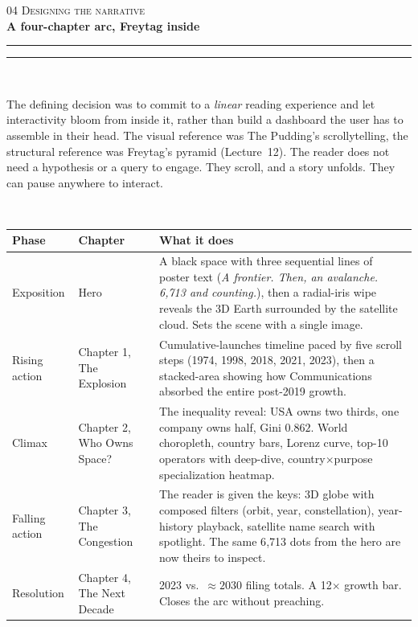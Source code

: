 \documentclass[9pt,a4paper]{article}
\newcommand{\eyebrow}[1]{{\footnotesize\textcolor{accentBlue}{\textsc{#1}}}}
\newcommand{\pageheader}[3]{%
  {\eyebrow{#1 \quad\textbullet\quad #2}}\\[3pt]%
  {\Large\bfseries #3}\\[3pt]%
  {\color{accentBlue}\rule{4em}{1.5pt}}\hspace{1pt}%
  {\color{accentBlue!28}\rule{\dimexpr\linewidth-4em-1pt\relax}{0.5pt}}\\[4pt]%
}
\newcommand{\subhead}[1]{%
  \vspace{4pt}%
  \noindent\tcbox[
    on line,
    colback=accentBlue!10!white, colframe=accentBlue,
    boxrule=0.3pt, arc=2.5pt,
    left=7pt, right=7pt, top=0.5pt, bottom=0.5pt,
  ]{\small\bfseries\color{accentBlue!85!black}#1}\\[2pt]%
}
\begin{document}
\pageheader{04}{Designing the narrative}{A four-chapter arc, Freytag inside}

\vspace{2pt}

The defining decision was to commit to a \textit{linear} reading experience and let interactivity bloom from inside it, rather than build a dashboard the user has to assemble in their head. The visual reference was The Pudding's scrollytelling, the structural reference was Freytag's pyramid (Lecture~12). The reader does not need a hypothesis or a query to engage. They scroll, and a story unfolds. They can pause anywhere to interact.

\vspace{2pt}

\subhead{Freytag's pyramid mapped to chapters}

\begin{tabularx}{\textwidth}{@{} l l X @{}}
\toprule
\textbf{Phase} & \textbf{Chapter} & \textbf{What it does}\\
\midrule
Exposition       & Hero                    & A black space with three sequential lines of poster text (\textit{A frontier. Then, an avalanche. 6{,}713 and counting.}), then a radial-iris wipe reveals the 3D Earth surrounded by the satellite cloud. Sets the scene with a single image.\\
Rising action    & Chapter 1, The Explosion & Cumulative-launches timeline paced by five scroll steps (1974, 1998, 2018, 2021, 2023), then a stacked-area showing how Communications absorbed the entire post-2019 growth.\\
Climax           & Chapter 2, Who Owns Space? & The inequality reveal: USA owns two thirds, one company owns half, Gini $0.862$. World choropleth, country bars, Lorenz curve, top-10 operators with deep-dive, country$\times$purpose specialization heatmap.\\
Falling action   & Chapter 3, The Congestion & The reader is given the keys: 3D globe with composed filters (orbit, year, constellation), year-history playback, satellite name search with spotlight. The same 6{,}713 dots from the hero are now theirs to inspect.\\
Resolution       & Chapter 4, The Next Decade & 2023 vs.\ $\approx 2030$ filing totals. A 12$\times$ growth bar. Closes the arc without preaching.\\
\bottomrule
\end{tabularx}

\vspace{4pt}
\end{document}
